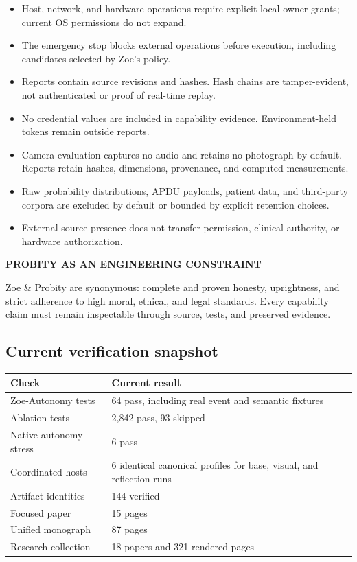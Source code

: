 \documentclass[11pt]{article}
\newcommand{\card}[2]{\colorbox{ZoeLight}{\parbox{0.94\textwidth}{\small\textbf{\color{ZoeCyan!50!black}#1}\par\smallskip #2\par}}}
\begin{document}
\begin{itemize}
  \item Host, network, and hardware operations require explicit local-owner grants; current OS permissions do not expand.
  \item The emergency stop blocks external operations before execution, including candidates selected by Zoe's policy.
  \item Reports contain source revisions and hashes. Hash chains are tamper-evident, not authenticated or proof of real-time replay.
  \item No credential values are included in capability evidence. Environment-held tokens remain outside reports.
  \item Camera evaluation captures no audio and retains no photograph by default. Reports retain hashes, dimensions, provenance, and computed measurements.
  \item Raw probability distributions, APDU payloads, patient data, and third-party corpora are excluded by default or bounded by explicit retention choices.
  \item External source presence does not transfer permission, clinical authority, or hardware authorization.
\end{itemize}

\card{PROBITY AS AN ENGINEERING CONSTRAINT}{Zoe \& Probity are synonymous: complete and proven honesty, uprightness, and strict adherence to high moral, ethical, and legal standards. Every capability claim must remain inspectable through source, tests, and preserved evidence.}

\subsection{Current verification snapshot}

\begin{center}
\begin{tabular}{ll}
\toprule
\textbf{Check} & \textbf{Current result}\\
\midrule
Zoe-Autonomy tests & 64 pass, including real event and semantic fixtures\\
Ablation tests & 2,842 pass, 93 skipped\\
Native autonomy stress & 6 pass\\
Coordinated hosts & 6 identical canonical profiles for base, visual, and reflection runs\\
Artifact identities & 144 verified\\
Focused paper & 15 pages\\
Unified monograph & 87 pages\\
Research collection & 18 papers and 321 rendered pages\\
\bottomrule
\end{tabular}
\end{center}
\end{document}

